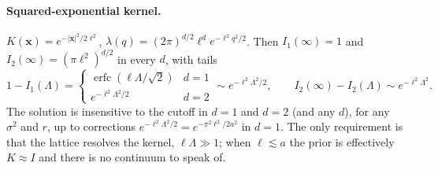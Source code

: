 \documentclass[11pt,a4paper]{article}
\newcommand{\Lam}{\Lambda}
\begin{document}
\paragraph{Squared-exponential kernel.}
$K(\mathbf x) = e^{-|\mathbf x|^2/2\ell^2}$, $\lambda(q) = (2\pi)^{d/2}\ell^d e^{-\ell^2q^2/2}$. Then $I_1(\infty) = 1$ and $I_2(\infty) = (\pi\ell^2)^{d/2}$ in every $d$, with tails
\begin{equation}
  1 - I_1(\Lam) = \begin{cases}\operatorname{erfc}(\ell\Lam/\sqrt2) & d=1\\ e^{-\ell^2\Lam^2/2} & d=2\end{cases}
  \sim e^{-\ell^2\Lam^2/2},
  \qquad
  I_2(\infty)-I_2(\Lam)\sim e^{-\ell^2\Lam^2} .
\end{equation}
The solution is insensitive to the cutoff in $d=1$ and $d=2$ (and any $d$), for any $\sigma^2$ and $r$, up to corrections $e^{-\ell^2\Lam^2/2} = e^{-\pi^2\ell^2/2a^2}$ in $d=1$. The only requirement is that the lattice resolves the kernel, $\ell\Lam\gg1$; when $\ell\lesssim a$ the prior is effectively $K\approx I$ and there is no continuum to speak of.
\end{document}
